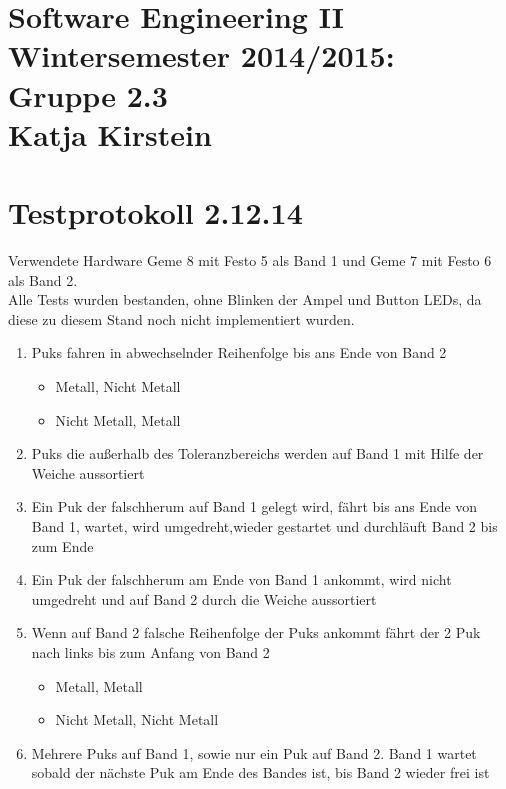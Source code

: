 \documentclass[a4paper,10pt]{article}
\begin{document}
  \section*{\small{Software Engineering II \\ Wintersemester 2014/2015: Gruppe 2.3 \\ Katja Kirstein}}
  \section*{Testprotokoll 2.12.14}
  Verwendete Hardware Geme 8 mit Festo 5 als Band 1 und Geme 7 mit Festo 6 als Band 2.\\
  Alle Tests wurden bestanden, ohne Blinken der Ampel und Button LEDs, da diese zu diesem Stand noch nicht implementiert wurden.
  \newline
\begin{enumerate}
 \item  Puks fahren in abwechselnder Reihenfolge bis ans Ende von Band 2
    \begin{itemize}
    \item Metall, Nicht Metall
    \item Nicht Metall, Metall
   \end{itemize}
 \item Puks die außerhalb des Toleranzbereichs werden auf Band 1 mit Hilfe der Weiche aussortiert
 \item Ein Puk der falschherum auf Band 1 gelegt wird, fährt bis ans Ende von Band 1, wartet, wird umgedreht,wieder gestartet 
    und durchläuft Band 2 bis zum Ende
 \item Ein Puk der falschherum am Ende von Band 1 ankommt, wird nicht umgedreht und auf Band 2 durch die Weiche aussortiert
 \item Wenn auf Band 2 falsche Reihenfolge der Puks ankommt fährt der 2 Puk nach links bis zum Anfang von Band 2
   \begin{itemize}
    \item Metall, Metall
    \item Nicht Metall, Nicht Metall
   \end{itemize}
 \item Mehrere Puks auf Band 1, sowie nur ein Puk auf Band 2. Band 1 wartet sobald der nächste Puk am Ende des Bandes ist, bis Band 2 wieder frei ist 
\end{enumerate}
\end{document}

